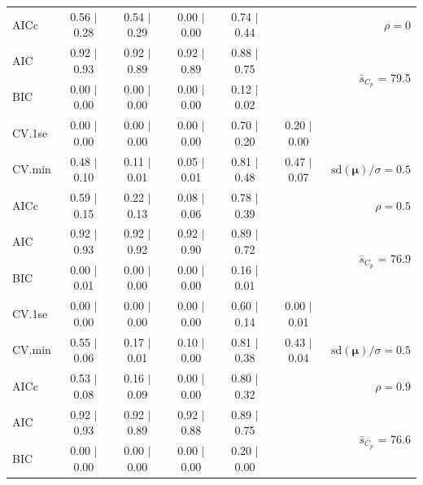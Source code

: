 \documentclass[12pt]{article}
\newcommand{\mr}[1]{\mathrm{#1}}
\newcommand{\bm}[1]{\mathbf{#1}}
\begin{document}
\begin{table}[p]
\begin{center}
\begin{tabular}{l*{5}{c}|r}
AICc & 0.56 $\mid$ 0.28 & 0.54 $\mid$ 0.29 & 0.00 $\mid$ 0.00 & 0.74 $\mid$ 0.44 & & $\rho=0$ \\
AIC & 0.92 $\mid$ 0.93 & 0.92 $\mid$ 0.89 & 0.92 $\mid$ 0.89 & 0.88 $\mid$ 0.75 & & \multirow{2}{*}{$\bar{s}_{C_p}$ = 79.5} \\
BIC & 0.00 $\mid$ 0.00 & 0.00 $\mid$ 0.00 & 0.00 $\mid$ 0.00 & 0.12 $\mid$ 0.02 & & \\
 \hline 
CV.1se & 0.00 $\mid$ 0.00 & 0.00 $\mid$ 0.00 & 0.00 $\mid$ 0.00 & 0.70 $\mid$ 0.20 & 0.20 $\mid$ 0.00 &\\
CV.min & 0.48 $\mid$ 0.10 & 0.11 $\mid$ 0.01 & 0.05 $\mid$ 0.01 & 0.81 $\mid$ 0.48 & 0.47 $\mid$ 0.07 &  $\mr{sd}(\bm{\mu})/\sigma=0.5$ \\
AICc & 0.59 $\mid$ 0.15 & 0.22 $\mid$ 0.13 & 0.08 $\mid$ 0.06 & 0.78 $\mid$ 0.39 & & $\rho=0.5$ \\
AIC & 0.92 $\mid$ 0.93 & 0.92 $\mid$ 0.92 & 0.92 $\mid$ 0.90 & 0.89 $\mid$ 0.72 & & \multirow{2}{*}{$\bar{s}_{C_p}$ = 76.9} \\
BIC & 0.00 $\mid$ 0.01 & 0.00 $\mid$ 0.00 & 0.00 $\mid$ 0.00 & 0.16 $\mid$ 0.01 & & \\
 \hline 
CV.1se & 0.00 $\mid$ 0.00 & 0.00 $\mid$ 0.00 & 0.00 $\mid$ 0.00 & 0.60 $\mid$ 0.14 & 0.00 $\mid$ 0.01 &\\
CV.min & 0.55 $\mid$ 0.06 & 0.17 $\mid$ 0.01 & 0.10 $\mid$ 0.00 & 0.81 $\mid$ 0.38 & 0.43 $\mid$ 0.04 &  $\mr{sd}(\bm{\mu})/\sigma=0.5$ \\
AICc & 0.53 $\mid$ 0.08 & 0.16 $\mid$ 0.09 & 0.00 $\mid$ 0.00 & 0.80 $\mid$ 0.32 & & $\rho=0.9$ \\
AIC & 0.92 $\mid$ 0.93 & 0.92 $\mid$ 0.89 & 0.92 $\mid$ 0.88 & 0.89 $\mid$ 0.75 & & \multirow{2}{*}{$\bar{s}_{C_p}$ = 76.6} \\
BIC & 0.00 $\mid$ 0.00 & 0.00 $\mid$ 0.00 & 0.00 $\mid$ 0.00 & 0.20 $\mid$ 0.00 & & \\
 \hline 
 \end{tabular}
\end{center}
\vspace{-1cm}
\end{table}
\end{document}
